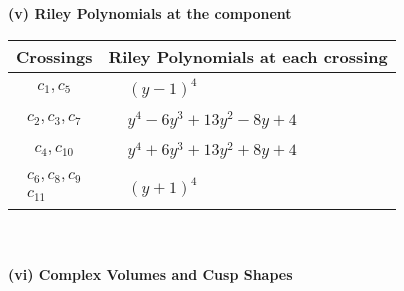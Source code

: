\documentclass[1p]{elsarticle_modified}
\theoremstyle{definition}
\begin{document}
\newpage\renewcommand{\arraystretch}{1}
\flushleft \textbf{(v) Riley Polynomials at the component}\newline \\
\begin{tabular}{m{50pt}|m{274pt}}
Crossings & \hspace{64pt}Riley Polynomials at each crossing \\
\hline $$\begin{aligned}c_{1},c_{5}\end{aligned}$$&$\begin{aligned}
&(y-1)^4
\end{aligned}$\\
\hline $$\begin{aligned}c_{2},c_{3},c_{7}\end{aligned}$$&$\begin{aligned}
&y^4-6 y^3+13 y^2-8 y+4
\end{aligned}$\\
\hline $$\begin{aligned}c_{4},c_{10}\end{aligned}$$&$\begin{aligned}
&y^4+6 y^3+13 y^2+8 y+4
\end{aligned}$\\
\hline $$\begin{aligned}c_{6},c_{8},c_{9}\\c_{11}\end{aligned}$$&$\begin{aligned}
&(y+1)^4
\end{aligned}$\\
\hline
\end{tabular}\\~\\
\newpage\flushleft \textbf{(vi) Complex Volumes and Cusp Shapes}
\end{document}
